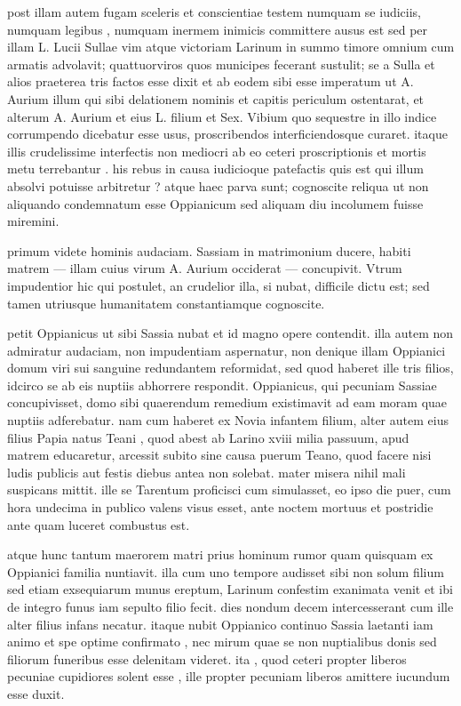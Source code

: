  post illam autem fugam sceleris et conscientiae testem numquam se iudiciis, numquam legibus , numquam inermem inimicis committere ausus est sed per illam L. Lucii Sullae vim atque victoriam Larinum in summo timore omnium cum armatis advolavit; quattuorviros quos municipes fecerant sustulit; se a Sulla et alios praeterea tris factos esse dixit et ab eodem sibi esse imperatum ut A. Aurium illum qui sibi delationem nominis et capitis periculum ostentarat, et alterum A. Aurium et eius L. filium et Sex. Vibium quo sequestre in illo indice corrumpendo dicebatur esse usus, proscribendos interficiendosque curaret. itaque illis crudelissime interfectis non mediocri ab eo ceteri proscriptionis et mortis metu terrebantur . his rebus in causa iudicioque patefactis quis est qui illum absolvi potuisse arbitretur ? atque haec parva sunt; cognoscite reliqua ut non aliquando condemnatum esse Oppianicum sed aliquam diu incolumem fuisse miremini.

 primum videte hominis audaciam. Sassiam in matrimonium ducere, habiti matrem — illam cuius virum A. Aurium occiderat — concupivit. Vtrum impudentior hic qui postulet, an crudelior illa, si nubat, difficile dictu est; sed tamen utriusque humanitatem constantiamque cognoscite.

 petit Oppianicus ut sibi Sassia nubat et id magno opere contendit. illa autem non admiratur audaciam, non impudentiam aspernatur, non denique illam Oppianici domum viri sui sanguine redundantem reformidat, sed quod haberet ille tris filios, idcirco se ab eis nuptiis abhorrere respondit. Oppianicus, qui pecuniam Sassiae concupivisset, domo sibi quaerendum remedium existimavit ad eam moram quae nuptiis adferebatur. nam cum haberet ex Novia infantem filium, alter autem eius filius Papia natus Teani , quod abest ab Larino xviii milia passuum, apud matrem educaretur, arcessit subito sine causa puerum Teano, quod facere nisi ludis publicis aut festis diebus antea non solebat. mater misera nihil mali suspicans mittit. ille se Tarentum proficisci cum simulasset, eo ipso die puer, cum hora undecima in publico valens visus esset, ante noctem mortuus et postridie ante quam luceret combustus est.

 atque hunc tantum maerorem matri prius hominum rumor quam quisquam ex Oppianici familia nuntiavit. illa cum uno tempore audisset sibi non solum filium sed etiam exsequiarum munus ereptum, Larinum confestim exanimata venit et ibi de integro funus iam sepulto filio fecit. dies nondum decem intercesserant cum ille alter filius infans necatur. itaque nubit Oppianico continuo Sassia laetanti iam animo et spe optime confirmato , nec mirum quae se non nuptialibus donis sed filiorum funeribus esse delenitam videret. ita , quod ceteri propter liberos pecuniae cupidiores solent esse , ille propter pecuniam liberos amittere iucundum esse duxit.

